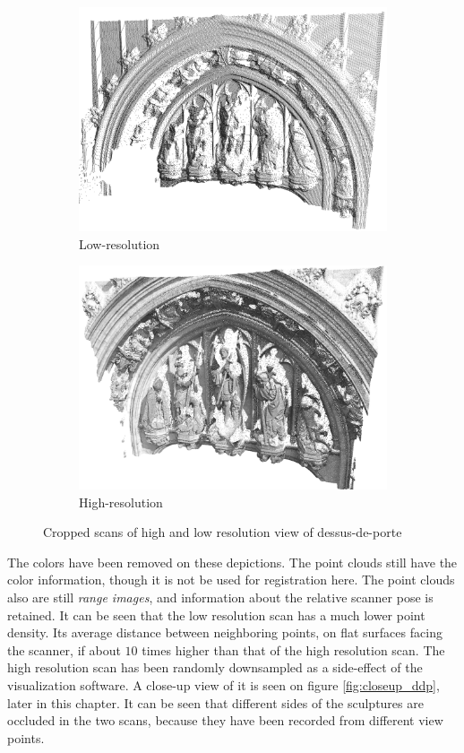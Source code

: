 \begin{figure}[h]
\centering
\begin{subfigure}{.5\textwidth}
\includegraphics[width=\linewidth]{fig/ddp_LO.png}
\caption{Low-resolution}
\end{subfigure}%
\begin{subfigure}{.5\textwidth}
\includegraphics[width=\linewidth]{fig/ddp_HI.png}
\caption{High-resolution}
\end{subfigure}
\caption{Cropped scans of high and low resolution view of dessus-de-porte}
\label{fig:ddp_hilo}
\end{figure}

The colors have been removed on these depictions. The point clouds still have the color information, though it is not be used for registration here. The point clouds also are still \emph{range images}, and information about the relative scanner pose is retained. It can be seen that the low resolution scan has a much lower point density. Its average distance between neighboring points, on flat surfaces facing the scanner, if about $10$ times higher than that of the high resolution scan. The high resolution scan has been randomly downsampled as a side-effect of the visualization software. A close-up view of it is seen on figure \ref{fig:closeup_ddp}, later in this chapter. It can be seen that different sides of the sculptures are occluded in the two scans, because they have been recorded from different view points.

